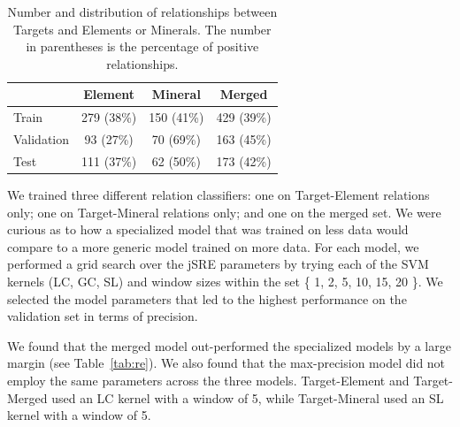 \documentclass[letterpaper]{article} %
\begin{document}
\begin{table}
\caption{Number and distribution of relationships between Targets and
Elements or Minerals. The number in parentheses is the percentage of
positive relationships. }
\label{tab:rels}
\begin{center}
\begin{tabular}{l|ccc}
           & Element & Mineral & Merged \\ \hline 
Train      & 279 (38\%) & 150 (41\%) & 429 (39\%) \\
Validation &  93 (27\%) &  70 (69\%) & 163 (45\%) \\ \hline
Test       & 111 (37\%) &  62 (50\%) & 173 (42\%) \\ \hline
\end{tabular}
\end{center}
\end{table}

We trained three different relation classifiers: one on Target-Element
relations only; one on Target-Mineral relations only; and one on the
merged set.  We were curious as to how a specialized model that was
trained on less data would compare to a more generic model trained on
more data.  For each model, we performed a grid search over the jSRE
parameters by trying each of the SVM kernels (LC, GC, SL) and window
sizes within the set \{ 1, 2, 5, 10, 15, 20 \}.  We selected the model
parameters that led to the highest performance on the validation set
in terms of precision.

We found that the merged model out-performed the specialized models by
a large margin (see Table~\ref{tab:re}).  We also found that the
max-precision model did not employ the same parameters across the
three models.  Target-Element and Target-Merged used an LC kernel with
a window of 5, while Target-Mineral used an SL kernel with a window of 5.
\end{document}
